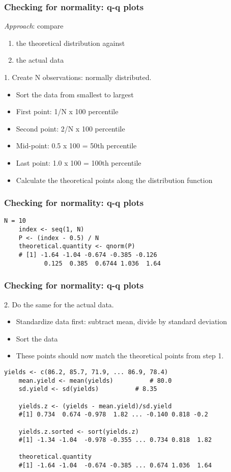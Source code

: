 \begin{frame}\frametitle{Checking for normality: q-q plots}

	\emph{Approach}: compare
	\begin{enumerate}
		\item the theoretical distribution against
		\item the actual data
	\end{enumerate}

	1. Create N observations: normally distributed.
	\begin{itemize}
		\item Sort the data from smallest to largest
		\item First point: 1/N x 100 percentile
		\item Second point: 2/N x 100 percentile
		\item Mid-point: 0.5 x 100 = 50th percentile
		\item Last point: 1.0 x 100 = 100th percentile
		\item Calculate the theoretical points along the distribution function
	\end{itemize}
\end{frame}

\begin{frame}[fragile]\frametitle{Checking for normality: q-q plots}
	
	\begin{lstlisting}[R]
	N = 10
	index <- seq(1, N)
	P <- (index - 0.5) / N
	theoretical.quantity <- qnorm(P)
	# [1] -1.64 -1.04 -0.674 -0.385 -0.126
	       0.125  0.385  0.6744 1.036  1.64
	\end{lstlisting}
\end{frame}

\begin{frame}[fragile]\frametitle{Checking for normality: q-q plots}
	2. Do the same for the actual data.
	\begin{itemize}
		\item Standardize data first: subtract mean, divide by standard deviation
		\item Sort the data
		\item These points should now match the theoretical points from step 1. \pause
	\end{itemize}
	
	\begin{lstlisting}[R]
	yields <- c(86.2, 85.7, 71.9, ... 86.9, 78.4)
	mean.yield <- mean(yields)          # 80.0
	sd.yield <- sd(yields)		    # 8.35

	yields.z <- (yields - mean.yield)/sd.yield
	#[1] 0.734  0.674 -0.978  1.82 ... -0.140 0.818 -0.2

	yields.z.sorted <- sort(yields.z)
	#[1] -1.34 -1.04  -0.978 -0.355 ... 0.734 0.818  1.82

	theoretical.quantity  
	#[1] -1.64 -1.04  -0.674 -0.385 ... 0.674 1.036  1.64
	\end{lstlisting}
\end{frame}

